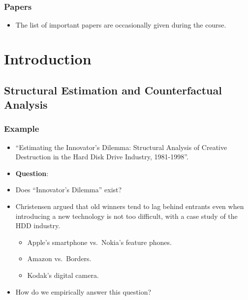 \documentclass[]{book}
\providecommand{\tightlist}{%
  \setlength{\itemsep}{0pt}\setlength{\parskip}{0pt}}
\theoremstyle{definition}
\theoremstyle{definition}
\theoremstyle{definition}
\theoremstyle{remark}
\begin{document}
\subsection{Papers}\label{papers}

\begin{itemize}
\tightlist
\item
  The list of important papers are occasionally given during the course.
\end{itemize}

\chapter{Introduction}\label{intro}

\section{Structural Estimation and Counterfactual
Analysis}\label{structural-estimation-and-counterfactual-analysis}

\subsection{Example}\label{example}

\begin{itemize}
\item
  \citet{Igami2017} ``Estimating the Innovator's Dilemma: Structural
  Analysis of Creative Destruction in the Hard Disk Drive Industry,
  1981-1998''.
\item
  \textbf{Question}:
\item
  Does ``Innovator's Dilemma'' \citep{Christensen1997} exist?
\item
  Christensen argued that old winners tend to lag behind entrants even
  when introducing a new technology is not too difficult, with a case
  study of the HDD industry.

  \begin{itemize}
  \tightlist
  \item
    Apple's smartphone vs.~Nokia's feature phones.
  \item
    Amazon vs.~Borders.
  \item
    Kodak's digital camera.
  \end{itemize}
\item
  How do we empirically answer this question?
\end{itemize}
\end{document}

